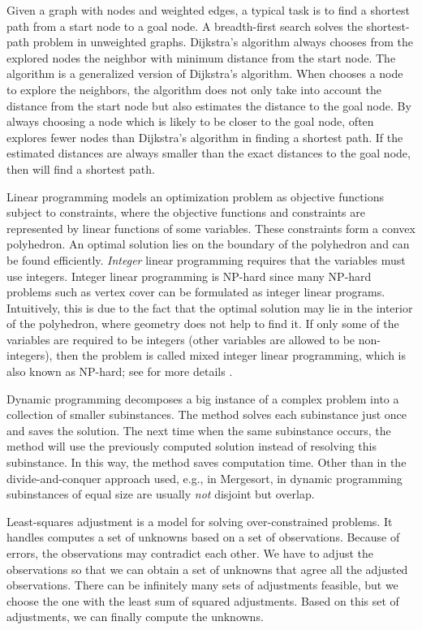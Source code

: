 Given a graph with nodes and weighted edges,
a typical task is to find a shortest path 
from a start node to a goal node.
A breadth-first search \parencite[chapter~22]{Cormen2009}
solves the shortest-path problem 
in unweighted graphs.
Dijkstra's algorithm \parencite{Dijkstra1959}
always chooses from the explored nodes the neighbor 
with minimum distance from the start node. 
The \Astar algorithm is 
a generalized version of Dijkstra's algorithm.
When \Astar chooses a node to explore the neighbors,
the algorithm does not only take into account 
the distance from the start node
but also estimates the distance to the goal node.
By always choosing a node which is likely 
to be closer to the goal node, 
\Astar often explores fewer nodes than Dijkstra's algorithm
in finding a shortest path.
If the estimated distances are always smaller than the exact 
distances to the goal node, 
then \Astar will find a shortest path.

Linear programming models an optimization problem as objective 
functions subject to constraints,
where the objective functions and constraints are represented by 
linear functions of some variables.
These constraints form a convex polyhedron.
An optimal solution lies on the boundary of the polyhedron and 
can be found efficiently.
\emph{Integer} linear programming requires that
the variables must use integers.
Integer linear programming is NP-hard
since many NP-hard problems such as vertex cover can be 
formulated as integer linear programs.
Intuitively, this is due to the fact that the optimal solution 
may lie in the interior of the polyhedron, where geometry does 
not help to find it.
If only some of the variables are required to be integers
(other variables are allowed to be non-integers), 
then the problem is called mixed integer linear programming,
which is also known as NP-hard; see for more details
\textcite[chapter~16]{Schrijver1986}.



Dynamic programming decomposes 
a big instance of a complex problem 
into a collection of smaller subinstances.
The method solves each subinstance just once 
and saves the solution. 
The next time when the same subinstance occurs, 
the method will use the previously computed solution 
instead of resolving this subinstance. 
In this way, the method saves computation time.
Other than in the divide-and-conquer approach used, 
e.g., in Mergesort, 
in dynamic programming subinstances of equal size 
are usually \emph{not} disjoint but overlap.

Least-squares adjustment is a model for solving 
over-constrained problems.  
It handles computes a set of unknowns 
based on a set of observations.
Because of errors, the observations may contradict each other.
We have to adjust the observations 
so that we can obtain a set of unknowns that agree 
all the adjusted observations.
There can be infinitely many sets of adjustments feasible, 
but we choose the one with the least sum of squared adjustments.
Based on this set of adjustments,
we can finally compute the unknowns.


